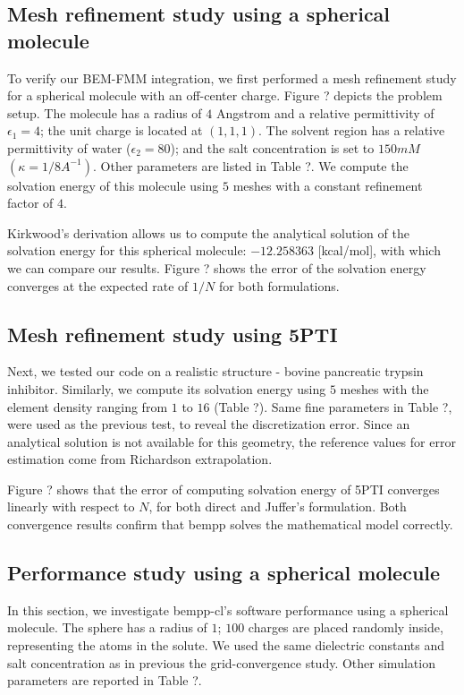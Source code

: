 \subsection{Mesh refinement study using a spherical molecule}

To verify our BEM-FMM integration, we first performed a mesh refinement study for a spherical molecule with an off-center charge.
Figure ? depicts the problem setup.
The molecule has a radius of $4$ Angstrom and a relative permittivity of $\epsilon_1 = 4$; the unit charge is located at $(1,1,1)$.
The solvent region has a relative permittivity of water ($\epsilon_2 = 80$); and the salt concentration is set to $150mM$ $(\kappa = 1/8A^{-1})$.
Other parameters are listed in Table ?.
We compute the solvation energy of this molecule using $5$ meshes with a constant refinement factor of $4$.

Kirkwood's derivation allows us to compute the analytical solution of the solvation energy for this spherical molecule: $-12.258363$ [kcal/mol],
with which we can compare our results. Figure ? shows the error of the solvation energy converges at the expected rate of $1/N$ for both formulations.


\subsection{Mesh refinement study using 5PTI}

Next, we tested our code on a realistic structure - bovine pancreatic trypsin inhibitor.
Similarly, we compute its solvation energy using $5$ meshes with the element density ranging from $1$ to $16$ (Table ?).
Same fine parameters in Table ?, were used as the previous test, to reveal the discretization error.
Since an analytical solution is not available for this geometry, the reference values for error estimation come from Richardson extrapolation.

Figure ? shows that the error of computing solvation energy of 5PTI converges linearly with respect to $N$, for both direct and Juffer's formulation.
Both convergence results confirm that bempp solves the mathematical model correctly.


\subsection{Performance study using a spherical molecule}

In this section, we investigate bempp-cl's software performance using a spherical molecule.
The sphere has a radius of $1$; $100$ charges are placed randomly inside, representing the atoms in the solute.
We used the same dielectric constants and salt concentration as in previous the grid-convergence study.
Other simulation parameters are reported in Table ?.

